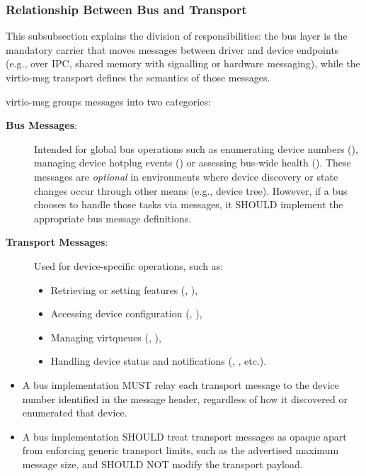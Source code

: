 \subsubsection{Relationship Between Bus and Transport}
\label{sec:Virtio Transport Options / Virtio Over Messages / Basic Concepts / Relationship between bus and transport}

This subsubsection explains the division of responsibilities: the bus layer is
the mandatory carrier that moves messages between driver and device endpoints
(e.g., over IPC, shared memory with signalling or hardware messaging), while
the virtio-msg transport defines the semantics of those messages.

virtio-msg groups messages into two categories:

\begin{description}
  \item[\textbf{Bus Messages}:]
    Intended for global bus operations such as enumerating device numbers
    (), managing device hotplug events ()
    or assessing bus-wide health ().
    These messages are \emph{optional} in environments where
    device discovery or state changes occur through other means (e.g., device
    tree). However, if a bus chooses to handle those tasks via messages,
    it SHOULD implement the appropriate bus message definitions.

  \item[\textbf{Transport Messages}:]
    Used for device-specific operations, such as:
    \begin{itemize}
      \item Retrieving or setting features (,
        ),
      \item Accessing device configuration (,
        ),
      \item Managing virtqueues (, ),
      \item Handling device status and notifications (,
        , etc.).
    \end{itemize}
\end{description}

\begin{itemize}
  \item A bus implementation MUST relay each transport message to the device
        number identified in the message header, regardless of how it
        discovered or enumerated that device.
  \item A bus implementation SHOULD treat transport messages as opaque apart
        from enforcing generic transport limits, such as the advertised maximum
        message size, and SHOULD NOT modify the transport payload.
\end{itemize}

